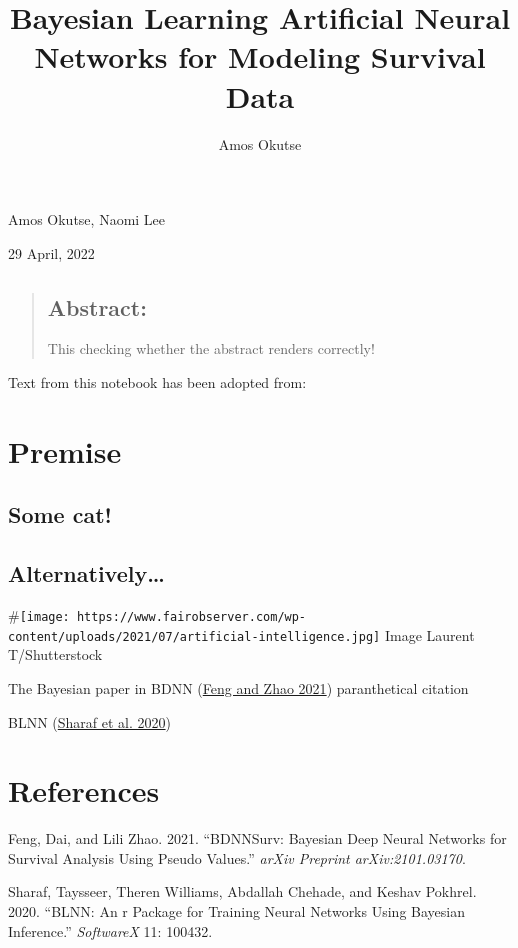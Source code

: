 \documentclass[]{tufte-handout}
\title{Bayesian Learning Artificial Neural Networks for Modeling
Survival Data}
\author{Amos Okutse}
\date{}
\newlength{\cslhangindent}
\newlength{\cslentryspacingunit} %
\newenvironment{CSLReferences}[2] %
 {%
  \setlength{\parindent}{0pt}
  \ifodd #1
  \let\oldpar\par
  \def\par{\hangindent=\cslhangindent\oldpar}
  \fi
  \setlength{\parskip}{#2\cslentryspacingunit}
 }%
 {}
\begin{document}
\maketitle




Amos Okutse, Naomi Lee

29 April, 2022

\begin{quote}
\hypertarget{abstract}{%
\subsection{Abstract:}\label{abstract}}

This checking whether the abstract renders correctly!
\end{quote}

Text from this notebook has been adopted from:

\hypertarget{premise}{%
\section{Premise}\label{premise}}

\hypertarget{some-cat}{%
\subsection{Some cat!}\label{some-cat}}

\hypertarget{alternatively}{%
\subsection{Alternatively\ldots{}}\label{alternatively}}

\#\texttt{[image: https://www.fairobserver.com/wp-content/uploads/2021/07/artificial-intelligence.jpg]}
Image Laurent T/Shutterstock

The Bayesian paper in BDNN
(\protect\hyperlink{ref-feng2021bdnnsurv}{Feng and Zhao 2021})
paranthetical citation

BLNN (\protect\hyperlink{ref-sharaf2020blnn}{Sharaf et al. 2020})

\hypertarget{references}{%
\section{References}\label{references}}

\hypertarget{refs}{}
\begin{CSLReferences}{1}{0}
\leavevmode{}%
Feng, Dai, and Lili Zhao. 2021. {``BDNNSurv: Bayesian Deep Neural
Networks for Survival Analysis Using Pseudo Values.''} \emph{arXiv
Preprint arXiv:2101.03170}.

\leavevmode{}%
Sharaf, Taysseer, Theren Williams, Abdallah Chehade, and Keshav Pokhrel.
2020. {``BLNN: An r Package for Training Neural Networks Using Bayesian
Inference.''} \emph{SoftwareX} 11: 100432.

\end{CSLReferences}
\end{document}
